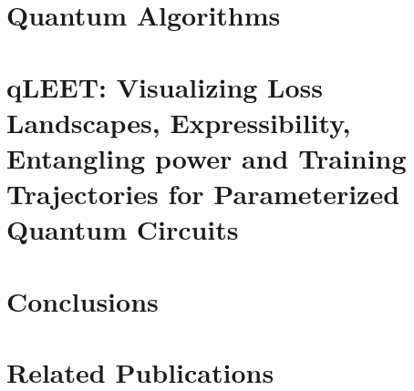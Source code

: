 \documentclass[11pt]{book}
\begin{document}

\chapter{Quantum Algorithms}
\label{ch:algos}



\chapter{qLEET: Visualizing Loss Landscapes, Expressibility, Entangling power and Training Trajectories for Parameterized Quantum Circuits}
\label{ch:qleet}



\chapter{Conclusions}
\label{ch:conc}



\chapter*{Related Publications}
\label{ch:relatedPubs}




 
\end{document}
